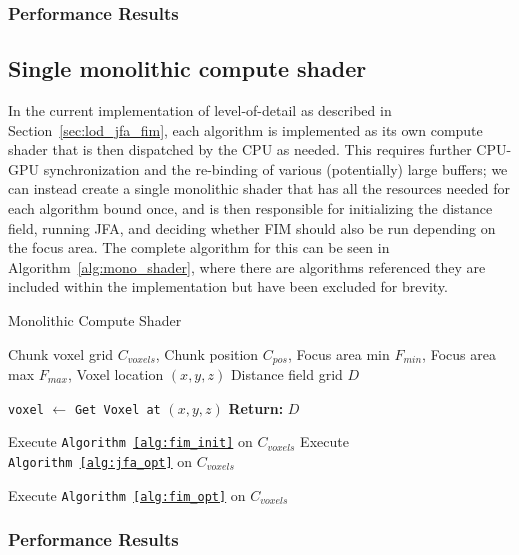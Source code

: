 \subsubsection{Performance Results}

\subsection{Single monolithic compute shader}
In the current implementation of level-of-detail as described in Section~\ref{sec:lod_jfa_fim}, each algorithm is
implemented as its own compute shader that is then dispatched by the CPU as needed. This requires further CPU-GPU
synchronization and the re-binding of various (potentially) large buffers; we can instead create a single monolithic
shader that has all the resources needed for each algorithm bound once, and is then responsible for initializing the
distance field, running JFA, and deciding whether FIM should also be run depending on the focus area. The complete
algorithm for this can be seen in Algorithm~\ref{alg:mono_shader}, where there are algorithms referenced they are
included within the implementation but have been excluded for brevity.

\begin{algorithm}[H]
    \caption{Monolithic Compute Shader}
    \label{alg:mono_shader}
    \begin{algorithmic}[1]
        \REQUIRE Chunk voxel grid \(C_{voxels}\), Chunk position \(C_{pos}\),
        Focus area min \(F_{min}\), Focus area max \(F_{max}\), Voxel location \((x, y, z)\)
        \ENSURE Distance field grid \(D\)

        \STATE \texttt{voxel} $\gets$ \texttt{Get Voxel at} \((x, y, z)\)
        \STATE \textbf{Return:} \(D\)
        \ENDIF

        \STATE Execute \texttt{Algorithm~\ref{alg:fim_init}} on $C_{voxels}$
        \STATE Execute \texttt{Algorithm~\ref{alg:jfa_opt}} on $C_{voxels}$

        \STATE Execute \texttt{Algorithm~\ref{alg:fim_opt}} on $C_{voxels}$
        \ENDIF
    \end{algorithmic}
\end{algorithm}

\subsubsection{Performance Results}

